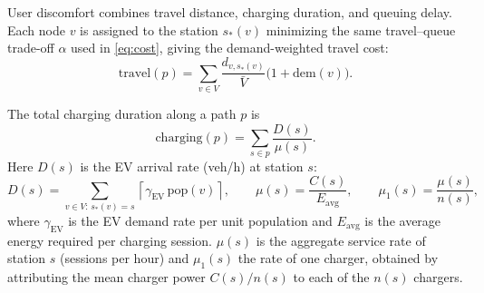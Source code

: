 \documentclass[graybox]{svmult}
\begin{document}
 User discomfort combines travel distance, charging duration, and queuing delay. Each node $v$ is assigned to the station $s_*(v)$ minimizing the same travel--queue trade-off $\alpha$ used in \eqref{eq:cost}, giving the demand-weighted travel cost:
\begin{equation}
\label{eq:travel}
\mathrm{travel}(p)
=
\sum_{v\in V}
\frac{d_{v,s_*(v)}}{\bar{V}}
\bigl(1+\mathrm{dem}(v)\bigr).
\end{equation}

The total charging duration along a path \(p\) is
\begin{equation}
\label{eq:charging}
\mathrm{charging}(p)
=
\sum_{s\in p}
\frac{D(s)}{\mu(s)}.
\end{equation}
Here \(D(s)\) is the EV arrival rate (veh/h) at station \(s\):
\begin{equation}
\label{eq:arrival}
D(s)
=
\sum_{v\in V:\,s_*(v)=s}
\left\lceil
\gamma_{\mathrm{EV}}\,\mathrm{pop}(v)
\right\rceil,
\qquad
\mu(s)
=
\frac{C(s)}{E_{\mathrm{avg}}},
\qquad
\mu_1(s)
=
\frac{\mu(s)}{n(s)},
\end{equation}
where \(\gamma_{\mathrm{EV}}\) is the EV demand rate per unit population and \(E_{\mathrm{avg}}\) is the average energy required per charging session. \(\mu(s)\) is the aggregate service rate of station \(s\) (sessions per hour) and \(\mu_1(s)\) the rate of one charger, obtained by attributing the mean charger power \(C(s)/n(s)\) to each of the \(n(s)\) chargers.
\end{document}
